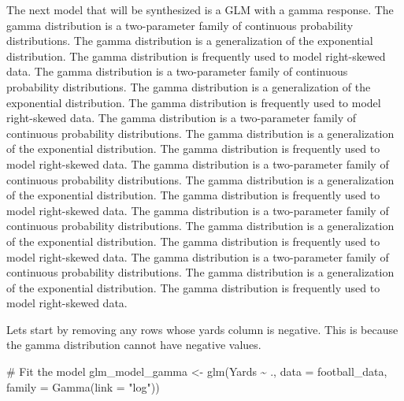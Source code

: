 \documentclass[
  super,
  preprint,
  3p]{elsarticle}
\newenvironment{Shaded}{\begin{snugshade}}{\end{snugshade}}
\newcommand{\AttributeTok}[1]{\textcolor[rgb]{0.40,0.45,0.13}{#1}}
\newcommand{\CommentTok}[1]{\textcolor[rgb]{0.37,0.37,0.37}{#1}}
\newcommand{\DecValTok}[1]{\textcolor[rgb]{0.68,0.00,0.00}{#1}}
\newcommand{\FloatTok}[1]{\textcolor[rgb]{0.68,0.00,0.00}{#1}}
\newcommand{\FunctionTok}[1]{\textcolor[rgb]{0.28,0.35,0.67}{#1}}
\newcommand{\NormalTok}[1]{\textcolor[rgb]{0.00,0.23,0.31}{#1}}
\newcommand{\OtherTok}[1]{\textcolor[rgb]{0.00,0.23,0.31}{#1}}
\newcommand{\SpecialCharTok}[1]{\textcolor[rgb]{0.37,0.37,0.37}{#1}}
\newcommand{\StringTok}[1]{\textcolor[rgb]{0.13,0.47,0.30}{#1}}
\begin{document}
The next model that will be synthesized is a GLM with a gamma response.
The gamma distribution is a two-parameter family of continuous
probability distributions. The gamma distribution is a generalization of
the exponential distribution. The gamma distribution is frequently used
to model right-skewed data. The gamma distribution is a two-parameter
family of continuous probability distributions. The gamma distribution
is a generalization of the exponential distribution. The gamma
distribution is frequently used to model right-skewed data. The gamma
distribution is a two-parameter family of continuous probability
distributions. The gamma distribution is a generalization of the
exponential distribution. The gamma distribution is frequently used to
model right-skewed data. The gamma distribution is a two-parameter
family of continuous probability distributions. The gamma distribution
is a generalization of the exponential distribution. The gamma
distribution is frequently used to model right-skewed data. The gamma
distribution is a two-parameter family of continuous probability
distributions. The gamma distribution is a generalization of the
exponential distribution. The gamma distribution is frequently used to
model right-skewed data. The gamma distribution is a two-parameter
family of continuous probability distributions. The gamma distribution
is a generalization of the exponential distribution. The gamma
distribution is frequently used to model right-skewed data.

Lets start by removing any rows whose yards column is negative. This is
because the gamma distribution cannot have negative values.

\begin{Shaded}
\end{Shaded}

\begin{Shaded}
\begin{Highlighting}[]
\CommentTok{\# Fit the model}
\NormalTok{glm\_model\_gamma }\OtherTok{\textless{}{-}} \FunctionTok{glm}\NormalTok{(Yards }\SpecialCharTok{\textasciitilde{}}\NormalTok{ ., }\AttributeTok{data =}\NormalTok{ football\_data, }\AttributeTok{family =} \FunctionTok{Gamma}\NormalTok{(}\AttributeTok{link =} \StringTok{"log"}\NormalTok{))}
\end{Highlighting}
\end{Shaded}
\end{document}
